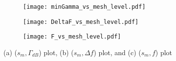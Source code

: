 \documentclass[12pt,a4paper]{article}
\begin{document}
{\begin{figure}[h]
\begin{center}
		\begin{subfigure}{0.3\linewidth}
			\texttt{[image: minGamma\_vs\_mesh\_level.pdf]}
			\caption{}
		\end{subfigure}
		\begin{subfigure}{0.3\linewidth}
			\texttt{[image: DeltaF\_vs\_mesh\_level.pdf]}
			\caption{}
		\end{subfigure}
		\begin{subfigure}{0.3\linewidth}
			\texttt{[image: F\_vs\_mesh\_level.pdf]}
			\caption{}
		\end{subfigure}
		\caption{\selectfont (a) ($s_m,\Gamma_{dB}$) plot, (b) ($s_m,\Delta f$) plot, and (c) ($s_m,f$) plot} 
	\end{center}
\end{figure}
}
\end{document}
